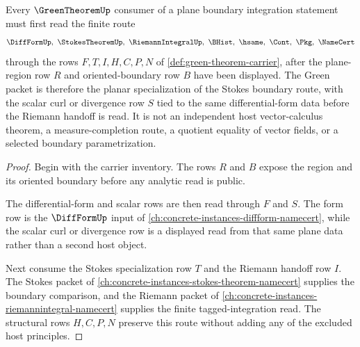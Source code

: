 \begin{theorem}\label{thm:green-theorem-stokes-plane-boundary-route}
Every $\GreenTheoremUp$ consumer of a plane boundary integration statement must first read the finite route
$$
\DiffFormUp,\ \StokesTheoremUp,\ \RiemannIntegralUp,\ \BHist,\ \hsame,\ \Cont,\ \Pkg,\ \NameCert
$$
through the rows $F,T,I,H,C,P,N$ of \autoref{def:green-theorem-carrier}, after the plane-region row $R$ and oriented-boundary row $B$ have been displayed. The Green packet is therefore the planar specialization of the Stokes boundary route, with the scalar curl or divergence row $S$ tied to the same differential-form data before the Riemann handoff is read. It is not an independent host vector-calculus theorem, a measure-completion route, a quotient equality of vector fields, or a selected boundary parametrization.
\end{theorem}
\begin{proof}
Begin with the carrier inventory. The rows $R$ and $B$ expose the region and its oriented boundary before any analytic read is public.

The differential-form and scalar rows are then read through $F$ and $S$. The form row is the $\DiffFormUp$ input of \autoref{ch:concrete-instances-diffform-namecert}, while the scalar curl or divergence row is a displayed read from that same plane data rather than a second host object.

Next consume the Stokes specialization row $T$ and the Riemann handoff row $I$. The Stokes packet of \autoref{ch:concrete-instances-stokes-theorem-namecert} supplies the boundary comparison, and the Riemann packet of \autoref{ch:concrete-instances-riemannintegral-namecert} supplies the finite tagged-integration read. The structural rows $H,C,P,N$ preserve this route without adding any of the excluded host principles.
\end{proof}


\begin{closurestatus}{\GreenTheoremUp}
  \theoryclosure{\seedClosure}
  \formalstatus{\unformalizedV}
\end{closurestatus}

